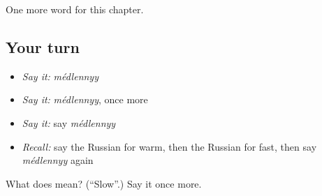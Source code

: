 \begin{grammarlens}[title={What you've built}]
One more word for this chapter.
\end{grammarlens}

\subsection*{Your turn}
\begin{itemize}
\raggedright
  \item \emph{Say it:} \emph{médlennyy}
  \item \emph{Say it:} \emph{médlennyy}, once more
  \item \emph{Say it:} say \emph{médlennyy}
  \item \emph{Recall:} say the Russian for warm, then the Russian for fast, then say \emph{médlennyy} again
\end{itemize}

\begin{tcolorbox}[breakable,colback=teal!4,colframe=teal!35!black,title={Before you move on}]
What does  mean? (\textquotedblleft{}Slow\textquotedblright{}.) Say it once more.
\end{tcolorbox}
